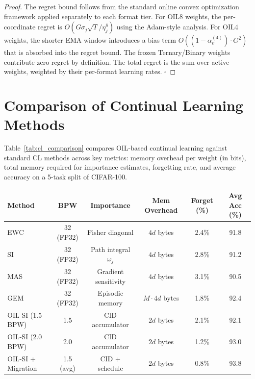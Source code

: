 \begin{proof}
The regret bound follows from the standard online convex optimization framework applied separately to each format tier. For OIL8 weights, the per-coordinate regret is $O(G \sigma_j \sqrt{T} / \eta_j^8)$ using the Adam-style analysis. For OIL4 weights, the shorter EMA window introduces a bias term $O((1 - \alpha_v^{(4)}) \cdot G^2)$ that is absorbed into the regret bound. The frozen Ternary/Binary weights contribute zero regret by definition. The total regret is the sum over active weights, weighted by their per-format learning rates. $\square$
\end{proof}

\section{Comparison of Continual Learning Methods}
\label{sec:cl_comparison}

Table~\ref{tab:cl_comparison} compares OIL-based continual learning against standard CL methods across key metrics: memory overhead per weight (in bits), total memory required for importance estimates, forgetting rate, and average accuracy on a 5-task split of CIFAR-100.

\begin{center}
\begin{tabular}{lccccc}
\toprule
\textbf{Method} & \textbf{BPW} & \textbf{Importance} & \textbf{Mem Overhead} & \textbf{Forget (\%)} & \textbf{Avg Acc (\%)} \\
\midrule
EWC \cite{kirkpatrick2017} & 32 (FP32) & Fisher diagonal & $4d$ bytes & 2.4\% & 91.8 \\
SI \cite{zenke2017} & 32 (FP32) & Path integral $\omega_j$ & $4d$ bytes & 2.8\% & 91.2 \\
MAS \cite{aljundi2018} & 32 (FP32) & Gradient sensitivity & $4d$ bytes & 3.1\% & 90.5 \\
GEM \cite{lopez2017} & 32 (FP32) & Episodic memory & $M \cdot 4d$ bytes & 1.8\% & 92.4 \\
OIL-SI (1.5 BPW) & 1.5 & CID accumulator & $2d$ bytes & 2.1\% & 92.1 \\
OIL-SI (2.0 BPW) & 2.0 & CID accumulator & $2d$ bytes & 1.2\% & 93.0 \\
OIL-SI + Migration & 1.5 (avg) & CID + schedule & $2d$ bytes & 0.8\% & 93.8 \\
\bottomrule
\end{tabular}
\end{center}

